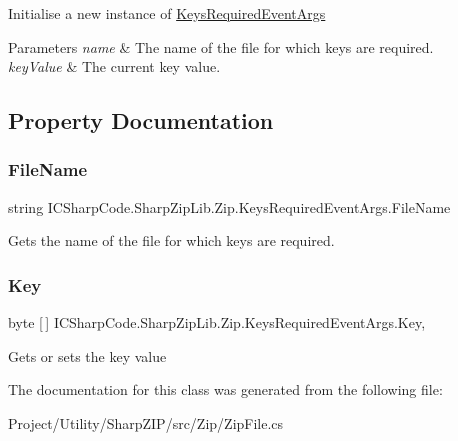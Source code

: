 Initialise a new instance of \hyperlink{class_i_c_sharp_code_1_1_sharp_zip_lib_1_1_zip_1_1_keys_required_event_args}{Keys\+Required\+Event\+Args} 


\begin{DoxyParams}{Parameters}
{\em name} & The name of the file for which keys are required.\\
\hline
{\em key\+Value} & The current key value.\\
\hline
\end{DoxyParams}


\subsection{Property Documentation}
\mbox{\label{class_i_c_sharp_code_1_1_sharp_zip_lib_1_1_zip_1_1_keys_required_event_args_a26b681dbba09e2957afab5682b4d7a1b}} 
\subsubsection{\texorpdfstring{File\+Name}{FileName}}
{\footnotesize\ttfamily string I\+C\+Sharp\+Code.\+Sharp\+Zip\+Lib.\+Zip.\+Keys\+Required\+Event\+Args.\+File\+Name\hspace{0.3cm}{\ttfamily [get]}}



Gets the name of the file for which keys are required. 

\mbox{\label{class_i_c_sharp_code_1_1_sharp_zip_lib_1_1_zip_1_1_keys_required_event_args_af0566571456f23d5443990e3f6a425fd}} 
\subsubsection{\texorpdfstring{Key}{Key}}
{\footnotesize\ttfamily byte \mbox{[}$\,$\mbox{]} I\+C\+Sharp\+Code.\+Sharp\+Zip\+Lib.\+Zip.\+Keys\+Required\+Event\+Args.\+Key\hspace{0.3cm}{\ttfamily [get]}, {\ttfamily [set]}}



Gets or sets the key value 



The documentation for this class was generated from the following file\+:\begin{DoxyCompactItemize}
\item 
Project/\+Utility/\+Sharp\+Z\+I\+P/src/\+Zip/Zip\+File.\+cs\end{DoxyCompactItemize}
